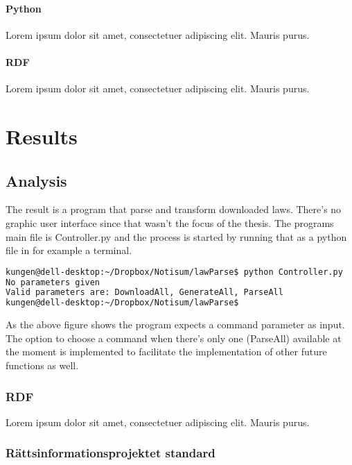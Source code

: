 \documentclass[a4paper,11pt]{kth-mag}
\begin{document}
\subsection{Python}

Lorem ipsum dolor sit amet, consectetuer adipiscing elit. Mauris
purus. 

\subsection{RDF}

Lorem ipsum dolor sit amet, consectetuer adipiscing elit. Mauris
purus. 

\part{Results}

\chapter{Analysis}

The result is a program that parse and transform downloaded laws. There’s no graphic user interface since that wasn’t the focus of the thesis. The programs main file is Controller.py and the process is started by running that as a python file in for example a terminal. 

\begin{lstlisting}[language=bash, caption=Command to run the program]
kungen@dell-desktop:~/Dropbox/Notisum/lawParse$ python Controller.py
No parameters given
Valid parameters are: DownloadAll, GenerateAll, ParseAll
kungen@dell-desktop:~/Dropbox/Notisum/lawParse$ 
\end{lstlisting}

As the above figure shows the program expects a command parameter as input. The option to choose a command when there’s only one (ParseAll) available at the moment is implemented to facilitate the implementation of other future functions as well. 

\section{RDF}

Lorem ipsum dolor sit amet, consectetuer adipiscing elit. Mauris
purus.

\section{Rättsinformationsprojektet standard}
\end{document}

